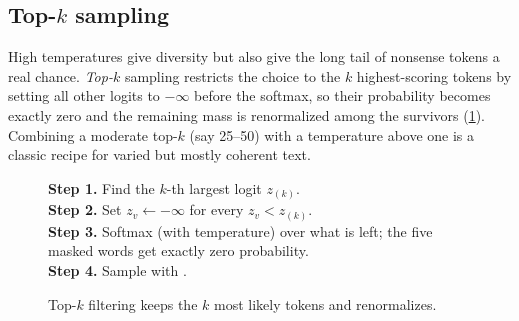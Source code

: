 \subsection{Top-$k$ sampling}\label{sec:pretrain:topk}

High temperatures give diversity but also give the long tail of nonsense tokens a real chance.
\emph{Top-$k$} sampling restricts the choice to the $k$ highest-scoring tokens by setting all
other logits to $-\infty$ before the softmax, so their probability becomes exactly zero and the
remaining mass is renormalized among the survivors (\cref{fig:pretrain:topk}). Combining a
moderate top-$k$ (say 25--50) with a temperature above one is a classic recipe for varied but
mostly coherent text.

\begin{figure}[t]
\centering
{}\hfill
\begin{minipage}[b]{0.34\linewidth}\footnotesize
\textbf{Step 1.} Find the $k$-th largest logit $z_{(k)}$.\\[2pt]
\textbf{Step 2.} Set $z_v\leftarrow-\infty$ for every $z_v<z_{(k)}$.\\[2pt]
\textbf{Step 3.} Softmax (with temperature) over what is left; the five masked words get exactly
zero probability.\\[2pt]
\textbf{Step 4.} Sample with .\vspace{6pt}
\end{minipage}
\caption{Top-$k$ filtering keeps the $k$ most likely tokens and renormalizes.}
\label{fig:pretrain:topk}
\end{figure}

